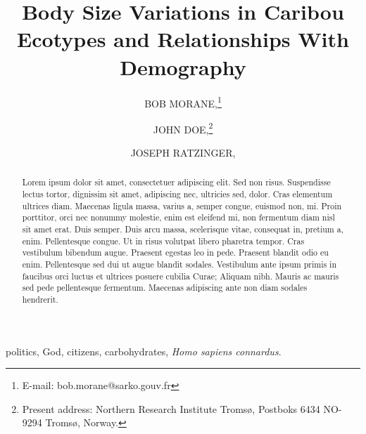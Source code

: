 \documentclass[a4paper,11pt,twoside]{article}
\begin{document}

\title{Body Size Variations in Caribou Ecotypes and Relationships With Demography}

\author{BOB MORANE,\footnote{E-mail: bob.morane@sarko.gouv.fr}}

\author{JOHN DOE,\footnote{Present address: Northern Research Institute Tromsø,
    Postboks 6434 NO-9294 Tromsø, Norway.}}

\author{JOSEPH RATZINGER,}

\date{}

\maketitle

\begin{abstract}
  Lorem ipsum dolor sit amet, consectetuer adipiscing elit. Sed non
  risus. Suspendisse lectus tortor, dignissim sit amet, adipiscing nec,
  ultricies sed, dolor. Cras elementum ultrices diam. Maecenas ligula massa,
  varius a, semper congue, euismod non, mi. Proin porttitor, orci nec nonummy
  molestie, enim est eleifend mi, non fermentum diam nisl sit amet erat. Duis
  semper. Duis arcu massa, scelerisque vitae, consequat in, pretium a,
  enim. Pellentesque congue. Ut in risus volutpat libero pharetra tempor. Cras
  vestibulum bibendum augue. Praesent egestas leo in pede. Praesent blandit odio
  eu enim. Pellentesque sed dui ut augue blandit sodales. Vestibulum ante ipsum
  primis in faucibus orci luctus et ultrices posuere cubilia Curae; Aliquam
  nibh. Mauris ac mauris sed pede pellentesque fermentum. Maecenas adipiscing
  ante non diam sodales hendrerit.
\end{abstract}

\begin{keywords}
politics, God, citizens, carbohydrates, \emph{Homo sapiens connardus}.
\end{keywords}

\end{document}
